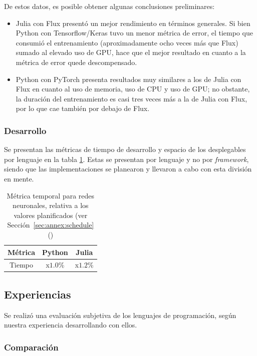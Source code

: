 \documentclass[11pt]{article}
\let\Oldsubsection\subsection
\renewcommand{\subsection}{\FloatBarrier\Oldsubsection}
\let\Oldsubsubsection\subsubsection
\renewcommand{\subsubsection}{\FloatBarrier\Oldsubsubsection}
\newcommand{\english}[1]{\textit{#1}}
\begin{document}
De estos datos, es posible obtener algunas conclusiones preliminares:

\begin{itemize}
    \item Julia con Flux presentó un mejor rendimiento en términos generales. Si bien Python con Tensorflow/Keras tuvo un menor métrica de error, el tiempo que consumió el entrenamiento (aproximadamente ocho veces más que Flux) sumado al elevado uso de GPU, hace que el mejor resultado en cuanto a la métrica de error quede descompensado.
    \item Python con PyTorch presenta resultados muy similares a los de Julia con Flux en cuanto al uso de memoria, uso de CPU y uso de GPU; no obstante, la duración del entrenamiento es casi tres veces más a la de Julia con Flux, por lo que cae también por debajo de Flux.
\end{itemize}



\subsubsection{Desarrollo}

Se presentan las métricas de tiempo de desarrollo y espacio de los desplegables por lenguaje en la tabla \ref{tab:nn:dev_metrics}. Estas se presentan por lenguaje y no por \english{framework}, siendo que las implementaciones se planearon y llevaron a cabo con esta división en mente.

\begin{table}[H]
\centering
\begin{tabular}{|c|c|c|}
\hline
Métrica & Python & Julia \\ \hline
Tiempo & x$1.0$\% & x$1.2$\% \\ \hline
\end{tabular}
\caption{Métrica temporal para redes neuronales, relativa a los valores planificados (ver Sección~\ref{sec:annex:schedule} ()}
\label{tab:nn:dev_metrics}
\end{table}

\subsection{Experiencias}

Se realizó una evaluación subjetiva de los lenguajes de programación, según nuestra experiencia desarrollando con ellos.

\subsubsection{Comparación}
\end{document}
